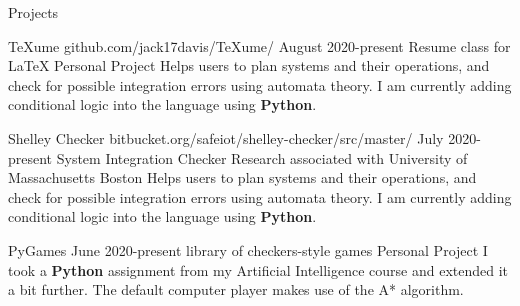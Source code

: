 \documentclass{resume} %
\begin{document}
\begin{Section} {Projects}
	\begin{Project} {TeXume}
		{
			{github.com/jack17davis/TeXume/}}
		{August 2020-present}
		{Resume class for LaTeX}
		{Personal Project}
		Helps users to plan systems and their operations, and check for possible integration errors using automata theory. I am currently adding conditional logic into the language using \textbf{Python}. 
	\end{Project}

	\begin{Project} {Shelley Checker}
		{
		{bitbucket.org/safeiot/shelley-checker/src/master/}}
		{July 2020-present}
		{System Integration Checker}
		{Research associated with University of Massachusetts Boston}
		Helps users to plan systems and their operations, and check for possible integration errors using automata theory. I am currently adding conditional logic into the language using \textbf{Python}. 
	\end{Project}

	\begin{Project} {PyGames}
		{}
		{June 2020-present}
		{library of checkers-style games}
		{Personal Project}
		I took a \textbf{Python} assignment from my Artificial Intelligence course and extended it a bit further. The default computer player makes use of the A* algorithm.
	\end{Project}
	
\end{Section}
\end{document}

